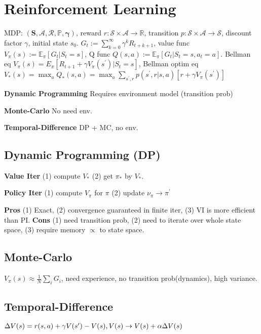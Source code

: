 \section{Reinforcement Learning}
MDP: \((\boldsymbol{S}, \mathcal{A}, \mathcal{R}, \mathbb{P}, \boldsymbol{\gamma})\), 
% 
reward \(r: \mathcal{S} \times \mathcal{A} \to \mathbb{R}\), 
% 
transition \(p: \mathcal{S} \times \mathcal{A} \to \mathcal{S}\), discount factor \(\gamma\), initial state \(s_0\).
% 
\(G_{t} := \sum_{k=0}^{\infty} \gamma^{k} R_{t+k+1}\), 
% 
value func \(V_{\pi}(s) := \mathbb{E}_{\pi}[G_{t} | S_{t}=s]\), 
% 
Q func \(Q(s, a) := \mathbb{E}_{\pi}[G_{t} | S_{t}=s, a_{t} = a]\).
% 
Bellman eq \(V_{\pi}(s)=E_{\pi}[R_{t+1}+\gamma V_{\pi}(s^{\prime}) | S_{t}=s]\),
% 
Bellman optim eq \(V_{*}(s)=\max _{a} Q_{*}(s, a)=\max _{a} \sum_{s^{\prime}, r} p(s^{\prime}, r | s, a)[r+\gamma V_{\pi}(s^{\prime})]\)

\textbf{Dynamic Programming} Requires environment model (transition prob)

\textbf{Monte-Carlo} No need env.

\textbf{Temporal-Difference} DP + MC, no env.

\subsection*{Dynamic Programming (DP)}
\textbf{Value Iter} (1) compute \(V_*\) (2) get \(\pi_*\) by  \(V_*\).

\textbf{Policy Iter} (1) compute \(V_\pi\) for \(\pi\) (2) update \(\nu_{\pi} \to \pi^{\prime}\)

\textbf{Pros} (1) Exact, (2) convergence guaranteed in finite iter, (3) VI is more efficient than PI.
\textbf{Cons} (1) need transition prob, (2) need to iterate over whole state space, (3) require memory \(\propto\) to state space.

\subsection*{Monte-Carlo}
\(V_\pi(s) \approx \frac{1}{N}\sum_i {G_i}\), need experience, no transition prob(dynamics), high variance.

\subsection*{Temporal-Difference}

\(\Delta V(s)=r(s, a)+\gamma V(s^{\prime})-V(s),\\ V(s) \to V(s)+\alpha \Delta V(s)\)

